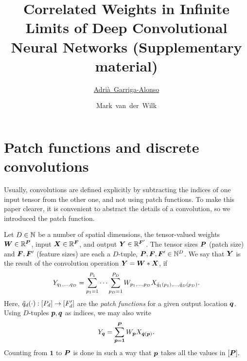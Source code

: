 \documentclass[accepted]{uai2021} %
\title{Correlated Weights in Infinite Limits of Deep Convolutional Neural Networks (Supplementary material)}
\author[1]{\href{mailto:Adrià Garriga-Alonso <ag919@cam.ac.uk>?Subject=Your UAI 2021 paper}{Adrià~Garriga-Alonso}{}}
\author[2]{Mark~van~der~Wilk}
\affil[1]{%
    Department of Engineering\\
    University of Cambridge\\
    UK
}
\affil[2]{%
    Department of Computer Science\\
    Imperial College London\\
    UK
}
\newcommand{\layersizebase}{\vF}
\newcommand{\patchsizebase}{\vP}
\newcommand{\patchf}[2]{{\tilde#1\bra{#2}}}
\newcommand{\patch}{\vp}               %
\newcommand{\patchs}{p}               %
\newcommand{\nextpatch}{\vq}
\newcommand{\nextpatchs}{q}
\newcommand{\0}{\boldsymbol{0}}
\newcommand{\1}{\boldsymbol{1}}
\begin{document}
\maketitle

\appendix %
\section{Patch functions and discrete convolutions} \label{app:patchf}
Usually, convolutions are defined explicitly by subtracting the indices of one input tensor from the other one, and not using patch functions. To make this paper clearer, it is convenient to abstract the details of a convolution, so we introduced the patch function.

\begin{definition}
  \label{def:convolution}
  Let $D \in {\mathbb{N}}$ be a number of spatial dimensions, the tensor-valued weights
  $\mW\in \sR^{\patchsizebase}$, input ${\bm{X}}\in {\mathbb{R}}^{{\bm{F}}}$, and output ${\bm{Y}} \in {\mathbb{R}}^{{\bm{F}}'}$.
  The tensor sizes $\patchsizebase$ (patch size) and $\layersizebase,\layersizebase'$ (feature sizes) are each a
  $D$-tuple, $\patchsizebase,\layersizebase,\layersizebase' \in \sN^{D}$.
  We say that ${\bm{Y}}$ is the result of the convolution operation ${\bm{Y}} = {\bm{W}}*{\bm{X}}$, if
  \begin{equation}
    Y_{\nextpatchs_{1},\dots,\nextpatchs_{D}} = \sum_{\patchs_{1}=1}^{P_{1}} \dots \sum_{\patchs_{D}=1}^{P_{D}} W_{\patchs_{1},\dots,\patchs_{D}} X_{\patchf{\nextpatchs_{1}}{\patchs_{1}}, \dots, \patchf{\nextpatchs_{D}}{\patchs_{D}}}.
    \label{eq:def-convolution-no-tuples}
  \end{equation}
  Here, $\patchf{\nextpatchs_{d}}{\cdot} : \countto{P_{d}} \to \countto{F'_{d}}$ are the \emph{patch functions} for a given output location $\nextpatch$. Using $D$-tuples $\patch,\nextpatch$ as indices, we may also write
  \begin{equation}
    Y_{\nextpatch} = \sum_{\patch=\1}^{\vP} W_{\patch} X_{\patchf{\nextpatch}{\patch}}.
    \label{eq:def-convolution-tuples}
  \end{equation}
  Counting from $\1$ to $\patchsizebase$ is done in such a way that $\patch$ takes all the values in $\countto{\patchsizebase}.$
  \end{definition}
\end{document}
